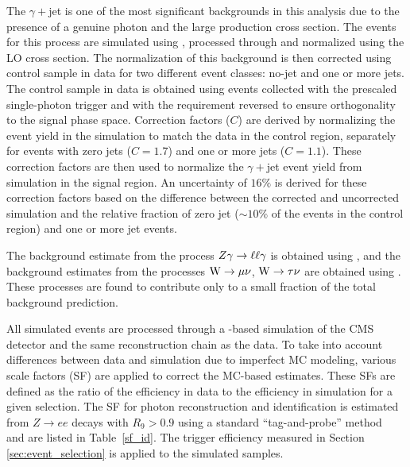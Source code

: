    The $\gamma+$jet is one of the most significant backgrounds in this analysis due to the presence of a genuine photon and the large production cross section. The events for this process are simulated using \MADGRAPH, processed through \PYTHIA and normalized using the LO cross section. The normalization of this background is then corrected using control sample in data for two different event classes: no-jet and one or more jets. The control sample in data is obtained using events collected with the prescaled single-photon trigger and with the \met requirement reversed to ensure orthogonality to the signal phase space. Correction factors ($C$) are derived by normalizing the event yield in the simulation to match the data in the control region, separately for events with zero jets ($C=1.7$) and one or more jets ($C=1.1$). These correction factors are then used to normalize the $\gamma+$jet event yield from simulation in the signal region. An uncertainty of $16\%$ is derived for these correction factors based on the difference between the corrected and uncorrected simulation and the relative fraction of zero jet ($\sim10\%$ of the events in the control region) and one or more jet events.

   The background estimate from the process $Z{\gamma}\rightarrow\ell\ell{\gamma}$ is obtained using \MADGRAPH, and the background estimates from the processes $\mathrm{W}\rightarrow \mu\nu$, $\mathrm{W}\rightarrow \tau\nu$ are obtained using \PYTHIA. These processes are found to contribute only to a small fraction of the total background prediction. 

   All simulated events are processed through a \GEANTfour-based simulation of the CMS detector \cite{GEANT} and the same reconstruction chain as the data. To take into account differences between data and simulation due to imperfect MC modeling, various scale factors (SF) are applied to correct the MC-based estimates. These SFs are defined as the ratio of the efficiency in data to the efficiency in simulation for a given selection. The SF for photon reconstruction and identification is estimated from $Z\rightarrow ee$ decays with $R_{9}>0.9$ using a standard ``tag-and-probe'' method ~\cite{CMS:2011aa} and are listed in Table~\ref{sf_id}. The trigger efficiency measured in Section \ref{sec:event_selection} is applied to the simulated samples.

